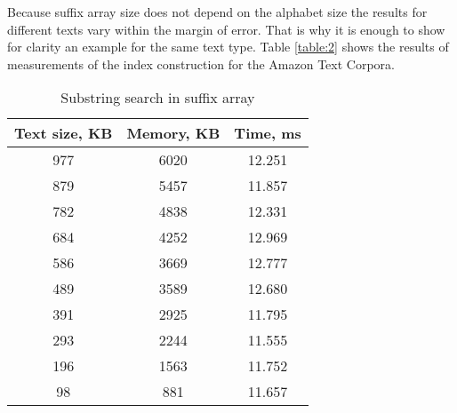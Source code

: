Because suffix array size does not depend on the alphabet size
the results for different texts vary within the margin of error.
That is why it is enough to show for clarity an example for the same text type.
Table \ref{table:2} shows the results of measurements of the index construction for the Amazon Text Corpora.


\begin{table}[h!]
    \centering
    \begin{tabular}{|c|c|c|}
        \hline
        Text size, KB & Memory, KB & Time, ms\\
        \hline
        977 & 6020 & 12.251\\
        \hline
        879 & 5457 & 11.857\\
        \hline
        782 & 4838 & 12.331\\
        \hline
        684 & 4252 & 12.969\\
        \hline
        586 & 3669 & 12.777\\
        \hline
        489 & 3589 & 12.680\\
        \hline
        391 & 2925 & 11.795\\
        \hline
        293 & 2244 & 11.555\\
        \hline
        196 & 1563 & 11.752\\
        \hline
        98 & 881 & 11.657\\
        \hline
    \end{tabular}
    \caption{Substring search in suffix array}
    \label{table:3}
\end{table}

